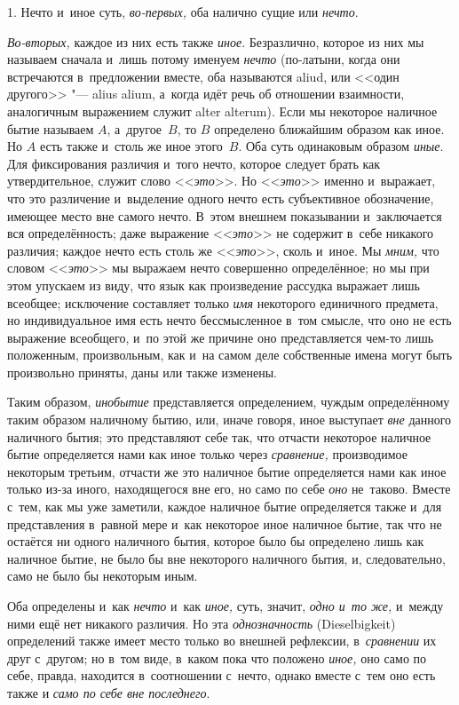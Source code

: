
1. Нечто и~иное суть, {\em во-первых,} оба налично сущие или {\em нечто}.

{\em Во-вторых,} каждое из них есть также {\em иное}. Безразлично, которое из
них мы называем сначала и~лишь потому именуем {\em нечто} (по-латыни, когда они
встречаются в~предложении вместе, оба называются aliud, или <<один другого>>
"--- alius alium, а~когда идёт речь об отношении взаимности, аналогичным
выражением служит alter alterum). Если мы некоторое наличное бытие называем
$A$, а~другое~$B$, то $B$ определено ближайшим образом как иное. Но $A$ есть
также и~столь же иное этого~$B$. Оба суть одинаковым образом {\em иные}. Для
фиксирования различия и~того нечто, которое следует брать как утвердительное,
служит слово <<{\em это}>>. Но <<{\em это}>> именно и~выражает, что это
различение и~выделение одного нечто есть субъективное обозначение, имеющее
место вне самого нечто. В~этом внешнем показывании и~заключается вся
определённость; даже выражение <<{\em это}>> не содержит в~себе никакого
различия; каждое нечто есть столь же <<{\em это}>>, сколь и~иное. Мы
{\em мним,} что словом <<{\em это}>> мы выражаем нечто совершенно определённое;
но мы при этом упускаем из виду, что язык как произведение рассудка выражает
лишь всеобщее; исключение составляет только {\em имя} некоторого единичного
предмета, но индивидуальное имя есть нечто бессмысленное в~том смысле, что оно
не есть выражение всеобщего, и~по этой же причине оно представляется чем-то
лишь положенным, произвольным, как и~на самом деле собственные имена могут быть
произвольно приняты, даны или также изменены.

Таким образом, {\em инобытие} представляется определением, чуждым определённому
таким образом наличному бытию, или, иначе говоря, иное выступает {\em вне}
данного наличного бытия; это представляют себе так, что отчасти некоторое
наличное бытие определяется нами как иное только через {\em сравнение,}
производимое некоторым третьим, отчасти же это наличное бытие определяется нами
как иное только из-за иного, находящегося вне его, но само по себе {\em оно}
не~таково. Вместе с~тем, как мы уже заметили, каждое наличное бытие
определяется также и~для представления в~равной мере и~как некоторое иное
наличное бытие, так что не остаётся ни одного наличного бытия, которое было бы
определено лишь как наличное бытие, не было бы вне некоторого наличного бытия,
и, следовательно, само не было бы некоторым иным.

Оба определены и~как {\em нечто} и~как {\em иное,} суть, значит,
{\em одно и~то же,} и~между ними ещё нет никакого различия. Но эта
{\em однозначность} (Diesel\-bigkeit) определений также имеет место только во
внешней рефлексии, в~{\em сравнении} их друг с~другом; но в~том виде, в~каком
пока что положено {\em иное,} оно само по себе, правда, находится в~соотношении
с~нечто, однако вместе с~тем оно есть также и
{\em само по себе вне последнего}.

